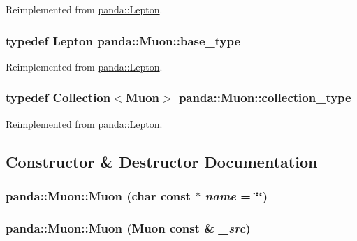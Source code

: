 Reimplemented from \hyperlink{classpanda_1_1Lepton_ad9bce760734162cd7166b034515fe1fe}{panda::Lepton}.\hypertarget{classpanda_1_1Muon_a071b288ec091c14f1fe42db77ef7821e}{
\subsubsection[{base\_\-type}]{\setlength{\rightskip}{0pt plus 5cm}typedef {\bf Lepton} {\bf panda::Muon::base\_\-type}}}
\label{classpanda_1_1Muon_a071b288ec091c14f1fe42db77ef7821e}


Reimplemented from \hyperlink{classpanda_1_1Lepton_ab8f2fc84ff093d5200d1905677d15578}{panda::Lepton}.\hypertarget{classpanda_1_1Muon_a74e005c403745217b3e67bd6709ccea3}{
\subsubsection[{collection\_\-type}]{\setlength{\rightskip}{0pt plus 5cm}typedef {\bf Collection}$<${\bf Muon}$>$ {\bf panda::Muon::collection\_\-type}}}
\label{classpanda_1_1Muon_a74e005c403745217b3e67bd6709ccea3}


Reimplemented from \hyperlink{classpanda_1_1Lepton_acba098c3047ecbfa9c1ad6c88a3ba95f}{panda::Lepton}.

\subsection{Constructor \& Destructor Documentation}
\hypertarget{classpanda_1_1Muon_abbf14d500569593961806573acc254ea}{
\subsubsection[{Muon}]{\setlength{\rightskip}{0pt plus 5cm}panda::Muon::Muon (char const $\ast$ {\em name} = {\ttfamily \char`\"{}\char`\"{}})}}
\label{classpanda_1_1Muon_abbf14d500569593961806573acc254ea}
\hypertarget{classpanda_1_1Muon_a250098913ac74eef61f952c1925c8c16}{
\subsubsection[{Muon}]{\setlength{\rightskip}{0pt plus 5cm}panda::Muon::Muon ({\bf Muon} const \& {\em \_\-src})}}
\label{classpanda_1_1Muon_a250098913ac74eef61f952c1925c8c16}


